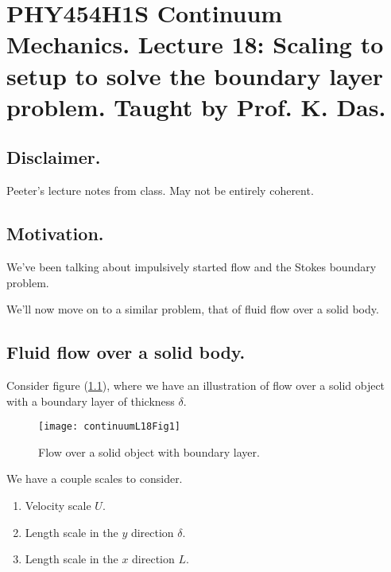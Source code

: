 
%

\chapter{PHY454H1S Continuum Mechanics.  Lecture 18: Scaling to setup to solve the boundary layer problem.  Taught by Prof. K. Das.}
\label{chap:continuumL18}
{}
\date{Mar 21, 2012}

\beginArtWithToc

\section{Disclaimer.}

Peeter's lecture notes from class.  May not be entirely coherent.

\section{Motivation.}

We've been talking about impulsively started flow and the Stokes boundary problem.

We'll now move on to a similar problem, that of fluid flow over a solid body.

\section{Fluid flow over a solid body.}

Consider figure (\ref{fig:continuumL18:continuumL18Fig1}), where we have an illustration of flow over a solid object with a boundary layer of thickness $\delta$.

\begin{figure}[htp]
   \centering
   \texttt{[image: continuumL18Fig1]}
   \caption{Flow over a solid object with boundary layer.}\label{fig:continuumL18:continuumL18Fig1}
\end{figure}

We have a couple scales to consider.

\begin{enumerate}
\item Velocity scale $U$.
\item Length scale in the $y$ direction $\delta$.
\item Length scale in the $x$ direction $L$.
\end{enumerate}

